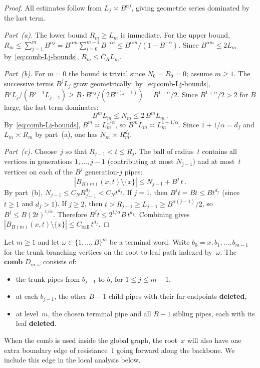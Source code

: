 \documentclass[aop]{imsart}
\theoremstyle{plain}
\theoremstyle{definition}
\begin{document}
	\begin{proof}
		All estimates follow from $L_j\asymp B^{\alpha j}$, giving geometric series dominated by the last term.
		
		\emph{Part~\textup{(a)}.}  The lower bound $R_m\geq L_m$ is immediate.  For the upper bound, $R_m\leq\sum_{j=1}^m B^{\alpha j} =B^{\alpha m}\sum_{i=0}^{m-1}B^{-\alpha i} \leq B^{\alpha m}/(1-B^{-\alpha})$.  Since $B^{\alpha m}\leq 2L_m$ by~\eqref{eq:comb-Lj-bounds}, $R_m\leq C_R L_m$.
		
		\emph{Part~\textup{(b)}.}  For $m=0$ the bound is trivial since $N_0=R_0=0$; assume $m\geq 1$.
		The successive terms $B^j L_j$ grow geometrically: by~\eqref{eq:comb-Lj-bounds}, $B^j L_j/(B^{j-1}L_{j-1}) \geq B\cdot B^{\alpha j}/(2B^{\alpha(j-1)}) =B^{1+\alpha}/2$.  Since $B^{1+\alpha}/2>2$ for $B$ large, the last term dominates:
		\begin{equation}\label{eq:rec-Nm-asymp}
			B^m L_m\leq N_m\leq 2\,B^m L_m\,.
		\end{equation}
		By~\eqref{eq:comb-Lj-bounds}, $B^m\asymp L_m^{1/\alpha}$, so $B^m L_m\asymp L_m^{1+1/\alpha}$.  Since $1+1/\alpha=d_f$ and $L_m\asymp R_m$ by part~(a), one has $N_m\asymp R_m^{d_f}$.
		
		\emph{Part~\textup{(c)}.}  Choose~$j$ so that $R_{j-1}<t\leq R_j$.  The ball of radius~$t$ contains all vertices in generations $1,\ldots,j{-}1$ (contributing at most $N_{j-1}$) and at most~$t$ vertices on each of the $B^j$ generation-$j$ pipes:
		\begin{equation}\label{eq:rec-ball-bound}
			|B_{H(m)}(x,t)\setminus\{x\}|
			\leq N_{j-1}+B^j\,t\,.
		\end{equation}
		By part~(b), $N_{j-1}\leq C_N R_{j-1}^{d_f} <C_N t^{d_f}$.  If $j=1$, then $B^j t=Bt\leq B t^{d_f}$ (since $t\geq 1$ and $d_f>1$).  If $j\geq 2$, then $t>R_{j-1}\geq L_{j-1} \geq B^{\alpha(j-1)}/2$, so $B^j\leq B(2t)^{1/\alpha}$.  Therefore $B^j t\leq 2^{1/\alpha}B\,t^{d_f}$.  Combining gives $|B_{H(m)}(x,t)\setminus\{x\}| \leq C_{\mathrm{ball}}\,t^{d_f}$.
	\end{proof}
	
	Let $m\geq 1$ and let $\omega\in\{1,\ldots,B\}^m$ be a terminal word.  Write $b_0=x,b_1,\ldots,b_{m-1}$ for the trunk branching vertices on the root-to-leaf path indexed by~$\omega$.  The \textbf{comb} $D_{m,\omega}$ consists of:
	\begin{itemize}
		\item the trunk pipes from $b_{j-1}$ to $b_j$ for $1\leq j\leq m{-}1$,
		\item at each $b_{j-1}$, the other $B{-}1$ child pipes with their far endpoints \textbf{deleted},
		\item at level~$m$, the chosen terminal pipe and all $B{-}1$ sibling pipes, each with its leaf \textbf{deleted}.
	\end{itemize}
	When the comb is used inside the global graph, the root~$x$ will also have one extra boundary edge of resistance~$1$ going forward along the backbone.  We include this edge in the local analysis below.
	
\end{document}
